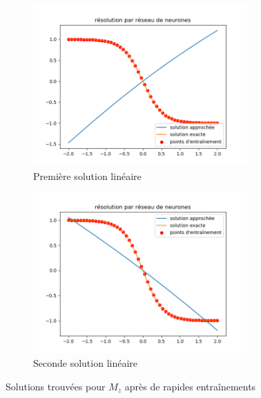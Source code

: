 \documentclass[12pt]{report}
\begin{document}
\begin{figure}
    \centering
    \begin{subfigure}[b]{0.4\textwidth}
        \centering
        \includegraphics[width=0.9\textwidth, height=0.9\textwidth]{min_loc1.png}
        \caption{Première solution linéaire}
    \end{subfigure}
    \hfill
    \begin{subfigure}[b]{0.4\textwidth}
        \centering
        \includegraphics[width=0.9\textwidth, height=0.9\textwidth]{min_loc2.png}
        \caption{Seconde solution linéaire}
    \end{subfigure}
       \caption{Solutions trouvées pour $M_z$ après de rapides entraînements}
       \label{fig:minimums locaux Mz}
\end{figure}
\end{document}
